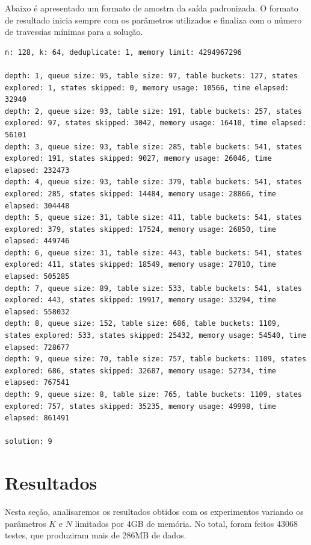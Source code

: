\documentclass[12pt]{article}
\begin{document}
Abaixo é apresentado um formato de amostra da saída padronizada. O formato de resultado inicia sempre com os parâmetros utilizados e finaliza com o número de travessias mínimas para a solução.

\begin{tiny}
\begin{verbatim}
n: 128, k: 64, deduplicate: 1, memory limit: 4294967296

depth: 1, queue size: 95, table size: 97, table buckets: 127, states explored: 1, states skipped: 0, memory usage: 10566, time elapsed: 32940
depth: 2, queue size: 93, table size: 191, table buckets: 257, states explored: 97, states skipped: 3042, memory usage: 16410, time elapsed: 56101
depth: 3, queue size: 93, table size: 285, table buckets: 541, states explored: 191, states skipped: 9027, memory usage: 26046, time elapsed: 232473
depth: 4, queue size: 93, table size: 379, table buckets: 541, states explored: 285, states skipped: 14484, memory usage: 28866, time elapsed: 304448
depth: 5, queue size: 31, table size: 411, table buckets: 541, states explored: 379, states skipped: 17524, memory usage: 26850, time elapsed: 449746
depth: 6, queue size: 31, table size: 443, table buckets: 541, states explored: 411, states skipped: 18549, memory usage: 27810, time elapsed: 505285
depth: 7, queue size: 89, table size: 533, table buckets: 541, states explored: 443, states skipped: 19917, memory usage: 33294, time elapsed: 558032
depth: 8, queue size: 152, table size: 686, table buckets: 1109, states explored: 533, states skipped: 25432, memory usage: 54540, time elapsed: 728677
depth: 9, queue size: 70, table size: 757, table buckets: 1109, states explored: 686, states skipped: 32687, memory usage: 52734, time elapsed: 767541
depth: 9, queue size: 8, table size: 765, table buckets: 1109, states explored: 757, states skipped: 35235, memory usage: 49998, time elapsed: 861491

solution: 9
\end{verbatim}
\end{tiny}

\section{Resultados} \label{resultados}

Nesta seção, analisaremos os resultados obtidos com os experimentos variando os parâmetros $K$ e $N$ limitados por 4GB de memória. No total, foram feitos 43068 testes, que produziram mais de 286MB de dados. 
\end{document}
